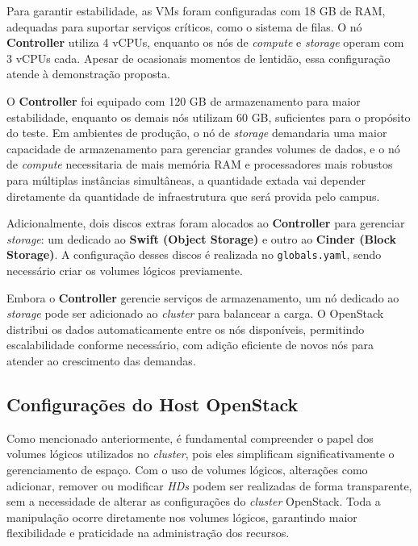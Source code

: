 Para garantir estabilidade, as VMs foram configuradas com 18 GB de RAM, adequadas para suportar serviços críticos, como o sistema de filas. O nó \textbf{Controller} utiliza 4 vCPUs, enquanto os nós de \textit{compute} e \textit{storage} operam com 3 vCPUs cada. Apesar de ocasionais momentos de lentidão, essa configuração atende à demonstração proposta.

O \textbf{Controller} foi equipado com 120 GB de armazenamento para maior estabilidade, enquanto os demais nós utilizam 60 GB, suficientes para o propósito do teste. Em ambientes de produção, o nó de \textit{storage} demandaria uma maior capacidade de armazenamento para gerenciar grandes volumes de dados, e o nó de \textit{compute} necessitaria de mais memória RAM e processadores mais robustos para múltiplas instâncias simultâneas, a quantidade extada vai depender diretamente da quantidade de infraestrutura que será provida pelo campus.

Adicionalmente, dois discos extras foram alocados ao \textbf{Controller} para gerenciar \textit{storage}: um dedicado ao \textbf{Swift (Object Storage)} e outro ao \textbf{Cinder (Block Storage)}. A configuração desses discos é realizada no \texttt{globals.yaml}, sendo necessário criar os volumes lógicos previamente.

Embora o \textbf{Controller} gerencie serviços de armazenamento, um nó dedicado ao \textit{storage} pode ser adicionado ao \textit{cluster} para balancear a carga. O OpenStack distribui os dados automaticamente entre os nós disponíveis, permitindo escalabilidade conforme necessário, com adição eficiente de novos nós para atender ao crescimento das demandas.



\subsection{Configurações do Host OpenStack}

Como mencionado anteriormente, é fundamental compreender o papel dos volumes lógicos utilizados no \textit{cluster}, pois eles simplificam significativamente o gerenciamento de espaço. Com o uso de volumes lógicos, alterações como adicionar, remover ou modificar \textit{HDs} podem ser realizadas de forma transparente, sem a necessidade de alterar as configurações do \textit{cluster} OpenStack. Toda a manipulação ocorre diretamente nos volumes lógicos, garantindo maior flexibilidade e praticidade na administração dos recursos.

